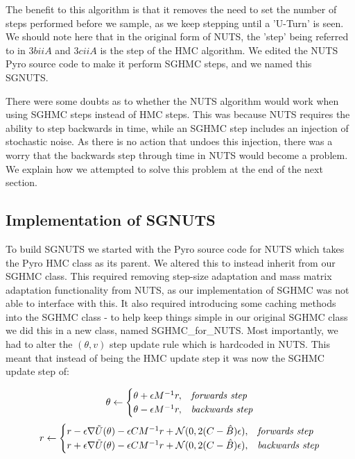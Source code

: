 The benefit to this algorithm is that it removes the need to set the number of steps performed before we sample, as we keep stepping until a 'U-Turn' is seen. We should note here that in the original form of NUTS, the 'step' being referred to in $3biiA$ and $3ciiA$ is the step of the HMC algorithm. We edited the NUTS Pyro source code to make it perform SGHMC steps, and we named this SGNUTS.

There were some doubts as to whether the NUTS algorithm would work when using SGHMC steps instead of HMC steps. This was because NUTS requires the ability to step backwards in time, while an SGHMC step includes an injection of stochastic noise. As there is no action that undoes this injection, there was a worry that the backwards step through time in NUTS would become a problem. We explain how we attempted to solve this problem at the end of the next section.

\subsection{Implementation of SGNUTS}
To build SGNUTS we started with the Pyro source code for NUTS \cite{nuts_code} which takes the Pyro HMC class as its parent. We altered this to instead inherit from our SGHMC class. This required removing step-size adaptation and mass matrix adaptation functionality from NUTS, as our implementation of SGHMC was not able to interface with this. It also required introducing some caching methods into the SGHMC class - to help keep things simple in our original SGHMC class we did this in a new class, named SGHMC\_for\_NUTS. Most importantly, we had to alter the $(\theta,v)$ step update rule which is hardcoded in NUTS. This meant that instead of being the HMC update step it was now the SGHMC update step of:

$$
    \theta \leftarrow 
    \begin{cases}\theta + \epsilon M^{-1}r, & \text{{\textit{forwards step}}}\\
                \theta - \epsilon M^{-1}r,  & \text{{\textit{backwards step}}}

\end{cases}
$$
$$
    r \leftarrow 
    \begin{cases}
                
    r - \epsilon \nabla \tilde{U}(\theta) - \epsilon C M^{-1}r + \mathcal{N}(0,2(C-\hat{B})\epsilon), & \text{{\textit{forwards step}}}\\
   
    r + \epsilon \nabla \tilde{U}(\theta) - \epsilon C M^{-1}r + \mathcal{N}(0,2(C-\hat{B})\epsilon), & \text{{\textit{backwards step}}}\\
 \end{cases}
    $$

